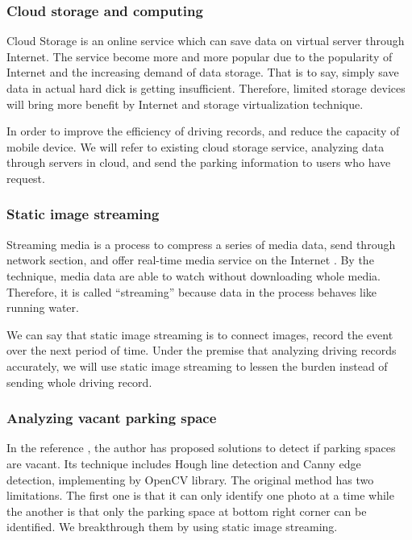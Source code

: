 \documentclass[journal,article,submit,moreauthors,pdftex,10pt,a4paper]{mdpi}
\begin{document}
%
\subsubsection{Cloud storage and computing}
%

Cloud Storage is an online service which can save data on virtual server
through Internet. The service become more and more popular due to the
popularity of Internet and the increasing demand of data storage. That
is to say, simply save data in actual hard dick is getting insufficient.
Therefore, limited storage devices will bring more benefit by Internet
and storage virtualization technique.

In order to improve the efficiency of driving records, and reduce the
capacity of mobile device. We will refer to existing cloud storage
service, analyzing data through servers in cloud, and send the parking
information to users who have request.

%
\subsubsection{Static image streaming}
%

Streaming media is a process to compress a series of media data, send
through network section, and offer real-time media service on the
Internet \cite{IOV2014}. By the technique, media data are able to watch without
downloading whole media. Therefore, it is called ``streaming'' because
data in the process behaves like running water.

We can say that static image streaming is to connect images,
record the event over the next period of time. Under the premise that
analyzing driving records accurately, we will use static image streaming
to lessen the burden instead of sending whole driving record.

%
\subsubsection{Analyzing vacant parking space}
%

In the reference \cite{ParkingSpot}, the author has proposed solutions to detect if
parking spaces are vacant. Its technique includes Hough line detection
and Canny edge detection, implementing by OpenCV library. The
original method has two limitations. The first one is that it can only
identify one photo at a time while the another is that only the parking
space at bottom right corner can be identified. We breakthrough them by
using static image streaming.
\end{document}
